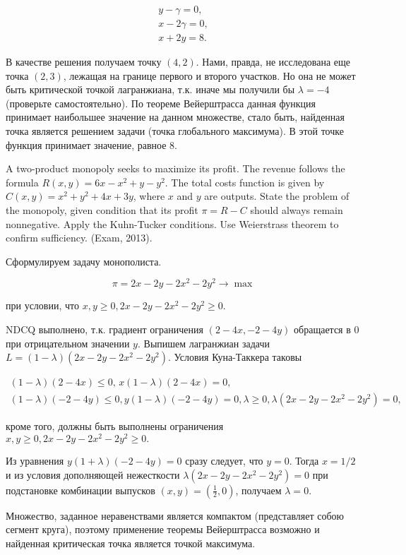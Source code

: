 \begin{problem}
\begin{sol}
\[\begin{array}{l} {y-\gamma =0,} \\ {x-2\gamma =0,} \\ {x+2y=8.} \end{array}\]

В качестве решения получаем точку $(4,2)$. Нами, правда, не исследована еще точка $(2,3)$, лежащая на границе первого и второго участков. Но она не может быть критической точкой лагранжиана, т.к. иначе мы получили бы $\lambda =-4$ (проверьте самостоятельно). По теореме Вейерштрасса данная функция принимает наибольшее значение на данном множестве, стало быть, найденная точка является решением задачи (точка глобального максимума). В этой точке функция принимает значение, равное 8.
\end{sol}
\end{problem}

\begin{problem}
A two-product monopoly seeks to maximize its profit. The revenue follows the formula $R(x,y)=6x-x^{2} +y-y^{2} $. The total costs function is given by $C(x,y)=x^{2} +y^{2} +4x+3y$, where $x$ and $y$ are outputs. State the problem of the monopoly, given condition that its profit $\pi =R-C$ should always remain nonnegative. Apply the Kuhn-Tucker conditions. Use Weierstrass theorem to confirm sufficiency. (Exam, 2013).


\begin{sol}
Сформулируем задачу монополиста.

\[\pi =2x-2y-2x^{2} -2y^{2} \to \max \]

при условии, что $x,y\ge 0,  2x-2y-2x^{2} -2y^{2} \ge 0.$

NDCQ выполнено, т.к. градиент ограничения $(2-4x,-2-4y)$ обращается в 0 при отрицательном значении $y$. Выпишем лагранжиан задачи $L=(1-\lambda )(2x-2y-2x^{2} -2y^{2} )$. Условия Куна-Таккера таковы

\[\begin{array}{l} {(1-\lambda )(2-4x)\le 0,\, x(1-\lambda )(2-4x)=0,} \\ {(1-\lambda )(-2-4y)\le 0,  y(1-\lambda )(-2-4y)=0,  \lambda \ge 0,  \lambda (2x-2y-2x^{2} -2y^{2} )=0,} \end{array}\]

кроме того, должны быть выполнены ограничения $x,y\ge 0,  2x-2y-2x^{2} -2y^{2} \ge 0.$

Из уравнения $y(1+\lambda)(-2-4y)=0$ сразу следует, что $y=0$. Тогда $x=1/2$ и из условия дополняющей нежесткости $\lambda(2x-2y-2x^2-2y^2)=0$ при подстановке комбинации выпусков $(x,y)=(\frac{1}{2} ,0)$, получаем  $\lambda =0$.

Множество, заданное неравенствами является компактом (представляет собою сегмент круга), поэтому применение теоремы Вейерштрасса возможно и найденная критическая точка является точкой максимума.
\end{sol}
\end{problem}

